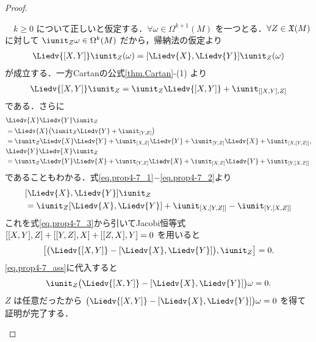 \documentclass[geometry_main]{subfiles}
\begin{document}
\begin{proof}
\begin{enumerate}
		　$k \ge 0$ について正しいと仮定する．$\forall \omega \in \Omega^{k+1}(M)$ を一つとる．$\forall Z \in \mathfrak{X}(M)$ に対して $\iunit_Z \omega \in \Omega^{k}(M)$ だから，帰納法の仮定より
		\begin{align} 
			\label{eq.prop4-7_ass}
			\Liedv{\comm{X}{Y}} \iunit_Z(\omega) = \comm{\Liedv{X}}{\Liedv{Y}}\iunit_Z(\omega)
		\end{align}
		が成立する．一方Cartanの公式\ref{thm.Cartan}-(1) より
		\begin{align} 
			\Liedv{\comm{X}{Y}} \iunit_Z = \iunit_Z \Liedv{\comm{X}{Y}} + \iunit_{\comm{\comm{X}{Y}}{Z}} \label{eq.prop4-7_3}
		\end{align}
		である．さらに
		\begin{align} 
			&\Liedv{X} \Liedv{Y} \iunit_Z \\
			&= \Liedv{X} \bigl( \iunit_Z \Liedv{Y} + \iunit_{\comm{Y}{Z}} \bigr) \\
			&= \iunit_Z \Liedv{X} \Liedv{Y} + \iunit_{\comm{X}{Z}} \Liedv{Y} + \iunit_{\comm{Y}{Z}} \Liedv{X} + \iunit_{\comm{X}{\comm{Y}{Z}}}, \label{eq.prop4-7_1}\\
			&\Liedv{Y} \Liedv{X} \iunit_Z \\
			&= \iunit_Z \Liedv{Y} \Liedv{X} + \iunit_{\comm{Y}{Z}} \Liedv{X} + \iunit_{\comm{X}{Z}} \Liedv{Y} + \iunit_{\comm{Y}{\comm{X}{Z}}} \label{eq.prop4-7_2}
		\end{align}
		であることもわかる．式\eqref{eq.prop4-7_1}$-$\eqref{eq.prop4-7_2}より
		\begin{align} 
			&\comm{\Liedv{X}}{\Liedv{Y}} \iunit_Z \\
			&= \iunit_Z \comm{\Liedv{X}}{\Liedv{Y}} + \iunit_{\comm{X}{\comm{Y}{Z}}} - \iunit_{\comm{Y}{\comm{X}{Z}}}
		\end{align}
		これを式\eqref{eq.prop4-7_3}から引いてJacobi恒等式 $\comm{\comm{X}{Y}}{Z} + \comm{\comm{Y}{Z}}{X} + \comm{\comm{Z}{X}}{Y} = 0$ を用いると
		\begin{align} 
			\comm{\bigl( \Liedv{\comm{X}{Y}} - \comm{\Liedv{X}}{\Liedv{Y}} \bigr)}{\iunit_Z } = 0.
		\end{align}
		\eqref{eq.prop4-7_ass}に代入すると
		\begin{align} 
			\iunit_Z \bigl( \Liedv{\comm{X}{Y}} - \comm{\Liedv{X}}{\Liedv{Y}}  \bigr) \omega = 0.
		\end{align}
		$Z$ は任意だったから $ \bigl( \Liedv{\comm{X}{Y}} - \comm{\Liedv{X}}{\Liedv{Y}}  \bigr) \omega = 0$ を得て証明が完了する．
	\end{enumerate}
\end{proof}
\end{document}
